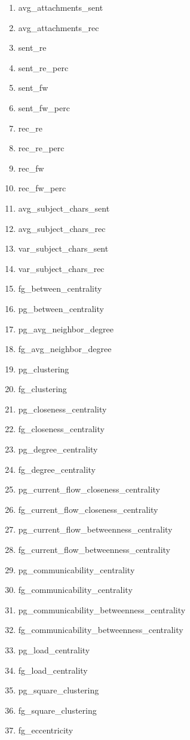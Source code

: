 \documentclass[12pt]{report}
\begin{document}
\begin{multicols}{2}
\begin{enumerate}
	\item avg\_attachments\_sent
	\item avg\_attachments\_rec
	\item sent\_re
	\item sent\_re\_perc
	\item sent\_fw
	\item sent\_fw\_perc
	\item rec\_re
	\item rec\_re\_perc
	\item rec\_fw
	\item rec\_fw\_perc
	\item avg\_subject\_chars\_sent
	\item avg\_subject\_chars\_rec
	\item var\_subject\_chars\_sent
	\item var\_subject\_chars\_rec
	\item fg\_between\_centrality
	\item pg\_between\_centrality
	\item pg\_avg\_neighbor\_degree
	\item fg\_avg\_neighbor\_degree
	\item pg\_clustering
	\item fg\_clustering
	\item pg\_closeness\_centrality
	\item fg\_closeness\_centrality
	\item pg\_degree\_centrality
	\item fg\_degree\_centrality
	\item pg\_current\_flow\_closeness\_centrality
    \item fg\_current\_flow\_closeness\_centrality
	\item pg\_current\_flow\_betweenness\_centrality
	\item fg\_current\_flow\_betweenness\_centrality
	\item pg\_communicability\_centrality
	\item fg\_communicability\_centrality
	\item pg\_communicability\_betweenness\_centrality
	\item fg\_communicability\_betweenness\_centrality
	\item pg\_load\_centrality
	\item fg\_load\_centrality
	\item pg\_square\_clustering
	\item fg\_square\_clustering
	\item fg\_eccentricity

\end{enumerate}
\end{multicols}
\end{document}
